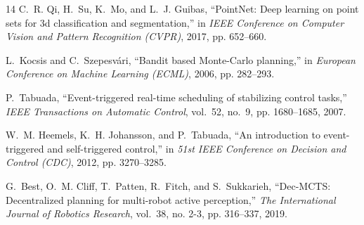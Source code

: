 \documentclass[conference]{IEEEtran}
\begin{document}
\begin{thebibliography}{14}
C.~R. Qi, H.~Su, K.~Mo, and L.~J. Guibas, ``{PointNet}: Deep learning on point sets for 3d classification and segmentation,'' in \emph{IEEE Conference on Computer Vision and Pattern Recognition (CVPR)}, 2017, pp. 652--660.

L.~Kocsis and C.~Szepesv{\'a}ri, ``Bandit based {Monte-Carlo} planning,'' in \emph{European Conference on Machine Learning (ECML)}, 2006, pp. 282--293.

P.~Tabuada, ``Event-triggered real-time scheduling of stabilizing control tasks,'' \emph{IEEE Transactions on Automatic Control}, vol.~52, no.~9, pp. 1680--1685, 2007.

W.~M. Heemels, K.~H. Johansson, and P.~Tabuada, ``An introduction to event-triggered and self-triggered control,'' in \emph{51st IEEE Conference on Decision and Control (CDC)}, 2012, pp. 3270--3285.

G.~Best, O.~M. Cliff, T.~Patten, R.~Fitch, and S.~Sukkarieh, ``Dec-{MCTS}: Decentralized planning for multi-robot active perception,'' \emph{The International Journal of Robotics Research}, vol.~38, no. 2-3, pp. 316--337, 2019.

\end{thebibliography}
\end{document}
